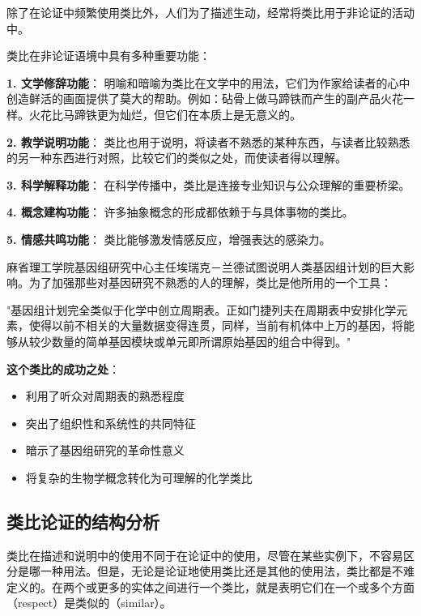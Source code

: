 除了在论证中频繁使用类比外，人们为了描述生动，经常将类比用于非论证的活动中。

\begin{theorembox}[title=类比的非论证功能分类]
类比在非论证语境中具有多种重要功能：

\textbf{1. 文学修辞功能}：
明喻和暗喻为类比在文学中的用法，它们为作家给读者的心中创造鲜活的画面提供了莫大的帮助。例如：砧骨上做马蹄铁而产生的副产品火花一样。火花比马蹄铁更为灿烂，但它们在本质上是无意义的。\cite{chesterton1910}

\textbf{2. 教学说明功能}：
类比也用于说明，将读者不熟悉的某种东西，与读者比较熟悉的另一种东西进行对照，比较它们的类似之处，而使读者得以理解。

\textbf{3. 科学解释功能}：
在科学传播中，类比是连接专业知识与公众理解的重要桥梁。

\textbf{4. 概念建构功能}：
许多抽象概念的形成都依赖于与具体事物的类比。

\textbf{5. 情感共鸣功能}：
类比能够激发情感反应，增强表达的感染力。
\end{theorembox}

\begin{examplebox}[title=科学类比的经典案例]
麻省理工学院基因组研究中心主任埃瑞克－兰德试图说明人类基因组计划的巨大影响。为了加强那些对基因研究不熟悉的人的理解，类比是他所用的一个工具：

"基因组计划完全类似于化学中创立周期表。正如门捷列夫在周期表中安排化学元素，使得以前不相关的大量数据变得连贯，同样，当前有机体中上万的基因，将能够从较少数量的简单基因模块或单元即所谓原始基因的组合中得到。"\cite{lander1995}

\textbf{这个类比的成功之处}：
\begin{itemize}
\item 利用了听众对周期表的熟悉程度
\item 突出了组织性和系统性的共同特征
\item 暗示了基因组研究的革命性意义
\item 将复杂的生物学概念转化为可理解的化学类比
\end{itemize}
\end{examplebox}

\subsection{类比论证的结构分析}

类比在描述和说明中的使用不同于在论证中的使用，尽管在某些实例下，不容易区分是哪一种用法。但是，无论是论证地使用类比还是其他的使用法，类比都是不难定义的。在两个或更多的实体之间进行一个类比，就是表明它们在一个或多个方面（respect）是类似的（similar）。

